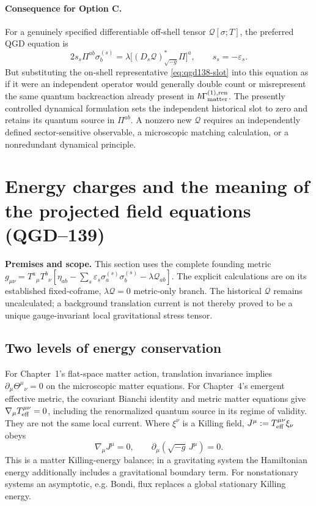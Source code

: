 \documentclass[11pt,a4paper]{article}
\begin{document}
\paragraph{Consequence for Option C.}
For a genuinely specified differentiable off-shell tensor
$\mathcal Q[\sigma;T]$, the preferred QGD equation is
\begin{equation}\label{eq:qgd138-optionC}
 \boxed{2s_s\Pi^{ab}\sigma_b^{(s)}=
 \lambda\bigl[(D_s\mathcal Q)^*_{\sqrt{-g}}\Pi\bigr]^a,\qquad
 s_s=-\varepsilon_s.}
\end{equation}
But substituting the on-shell representative
\eqref{eq:qgd138-slot} into this equation as if it were an
independent operator would generally double count or misrepresent the
same quantum backreaction already present in
$\hbar\Gamma_{\rm matter}^{(1),\rm ren}$.
The presently controlled dynamical formulation sets the independent
historical slot to zero and retains its quantum source in $\Pi^{ab}$.
A nonzero new $\mathcal Q$ requires an independently defined
sector-sensitive observable, a microscopic matching calculation, or a
nonredundant dynamical principle.


\section{Energy charges and the meaning of the projected field equations (QGD--139)}
\label{sec:qgd139-energycharges}
\textbf{Premises and scope.} This section uses the complete founding metric
$g_{\mu\nu}=T^a{}_{\mu}T^b{}_{\nu}[\eta_{ab}-\sum_s\varepsilon_s\sigma_a^{(s)}\sigma_b^{(s)}-\lambda\mathcal Q_{ab}]$.
The explicit calculations are on its established fixed-coframe,
$\lambda\mathcal Q=0$ metric-only branch. The historical $\mathcal Q$
remains uncalculated; a background translation current is not thereby
proved to be a unique gauge-invariant local gravitational stress tensor.

\subsection{Two levels of energy conservation}
For Chapter~1's flat-space matter action, translation invariance implies
$\partial_\mu\Theta^\mu{}_{\nu}=0$ on the microscopic matter equations.
For Chapter~4's emergent effective metric, the covariant Bianchi identity
and metric matter equations give $\nabla_\mu T_{\rm eff}^{\mu\nu}=0$,
including the renormalized quantum source in its regime of validity.
They are not the same local current. Where $\xi^\nu$ is a Killing field,
$J^\mu:=T_{\rm eff}^{\mu\nu}\xi_\nu$ obeys
\begin{equation}\label{eq:qgd139-killing}
\nabla_\mu J^\mu=0,\qquad
\partial_\mu(\sqrt{-g}\,J^\mu)=0.
\end{equation}
This is a matter Killing-energy balance; in a gravitating system the
Hamiltonian energy additionally includes a gravitational boundary term.
For nonstationary systems an asymptotic, e.g. Bondi, flux replaces a
global stationary Killing energy.
\end{document}

